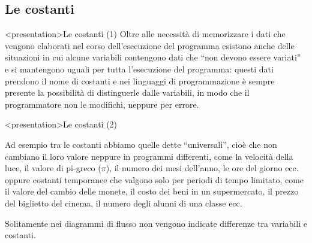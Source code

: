 \documentclass[
    notheorems,
    11pt,
    compress,
    aspectratio=169
]{beamer}
\begin{document}
\subsection{Le costanti}

\begin{frame}<presentation>{Le costanti (1)}
    Oltre alle necessità di memorizzare i dati che vengono elaborati nel corso dell’esecuzione del programma esistono anche delle situazioni in cui alcune variabili contengono dati che “non devono essere variati” e si mantengono uguali per tutta l’esecuzione del programma: questi dati prendono il nome di costanti e nei linguaggi di programmazione è sempre presente la possibilità di distinguerle dalle variabili, in modo che il programmatore non le modifichi, neppure per errore.
\end{frame}

\begin{frame}<presentation>{Le costanti (2)}
    \begin{block}{}
        Ad esempio tra le costanti abbiamo quelle dette “universali”, cioè che non cambiano il loro valore neppure in programmi differenti, come la velocità della luce, il valore di pi-greco (\(\pi\)), il numero dei mesi dell’anno, le ore del giorno ecc. oppure costanti temporanee che valgono solo per periodi di tempo limitato, come il valore del cambio delle monete, il costo dei beni in un supermercato, il prezzo del biglietto del cinema, il numero degli alunni di una classe ecc.
    \end{block}

    \pause
    \vspace{\baselineskip}

    Solitamente nei diagrammi di flusso non vengono indicate differenze tra variabili e costanti.
\end{frame}
\end{document}
